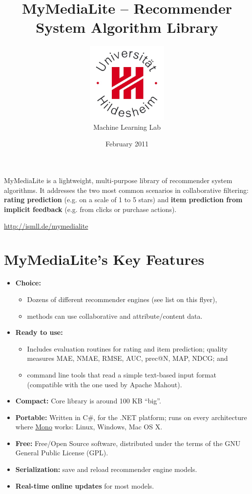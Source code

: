 \documentclass[a4paper, foldmark, 12pt]{leaflet}
\title{MyMediaLite -- Recommender System Algorithm Library}
\author{
	\includegraphics[width=4.0cm]{fig/uni-hildesheim-400x400.jpg}\\
	Machine Learning Lab
}
\date{February 2011}
\begin{document}
\maketitle

MyMediaLite is a lightweight, multi-purpose library
of recommender system algorithms.
It addresses the two most common scenarios in collaborative filtering:
\textbf{rating prediction} (e.g. on a scale of 1 to 5 stars)
and \textbf{item prediction from implicit feedback} (e.g. from clicks or purchase actions).

\begin{center}
	\url{http://ismll.de/mymedialite}
\end{center}

\newpage

\section{MyMediaLite's Key Features}


\begin{itemize}
	\item \textbf{Choice:}
		\begin{itemize}
			\item Dozens of different recommender engines (see list on this flyer),
			\item methods can use collaborative and attribute/content data.
		\end{itemize}
	\item \textbf{Ready to use:}
		\begin{itemize}
			\item Includes evaluation routines for rating and item prediction;
			      quality measures MAE, NMAE, RMSE, AUC, prec@N, MAP, NDCG; and
			\item command line tools that read a simple text-based input format
                              (compatible with the one used by Apache Mahout).
		\end{itemize}
	\item \textbf{Compact:} Core library is around 100 KB ``big''.
	\item \textbf{Portable:} Written in C\#, for the .NET platform;
	      runs on every architecture where \href{www.mono-project.com}{Mono} works:
	      Linux, Windows, Mac OS X.
	\item \textbf{Free:} Free/Open Source software, distributed under the terms of the
	      GNU General Public License (GPL).
	\item \textbf{Serialization:} save and reload recommender engine models.
	\item \textbf{Real-time online updates} for most models.
\end{itemize}
\end{document}
